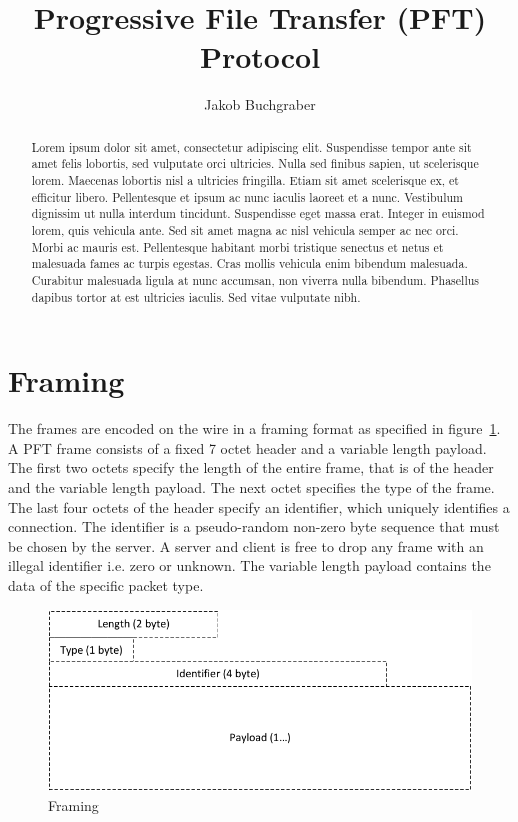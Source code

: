 \documentclass[]{article}
\begin{document}
\title{Progressive File Transfer (PFT) Protocol}
\author{
	Jakob Buchgraber
	}

\maketitle
\tableofcontents
\newpage

\begin{abstract}
Lorem ipsum dolor sit amet, consectetur adipiscing elit. Suspendisse tempor ante sit amet felis lobortis, sed vulputate orci ultricies. Nulla sed finibus sapien, ut scelerisque lorem. Maecenas lobortis nisl a ultricies fringilla. Etiam sit amet scelerisque ex, et efficitur libero. Pellentesque et ipsum ac nunc iaculis laoreet et a nunc. Vestibulum dignissim ut nulla interdum tincidunt. Suspendisse eget massa erat. Integer in euismod lorem, quis vehicula ante. Sed sit amet magna ac nisl vehicula semper ac nec orci. Morbi ac mauris est. Pellentesque habitant morbi tristique senectus et netus et malesuada fames ac turpis egestas. Cras mollis vehicula enim bibendum malesuada. Curabitur malesuada ligula at nunc accumsan, non viverra nulla bibendum. Phasellus dapibus tortor at est ultricies iaculis. Sed vitae vulputate nibh.
\end{abstract}


\section{Framing}

The frames are encoded on the wire in a framing format as specified in figure~\ref{framing}.
A PFT frame consists of a fixed 7 octet header and a variable length payload. The first
two octets specify the length of the entire frame, that is of the header and the variable
length payload. The next octet specifies the type of the frame. The last four octets of
the header specify an identifier, which uniquely identifies a connection. The identifier
is a pseudo-random non-zero byte sequence that must be chosen by the server. A server and
client is free to drop any frame with an illegal identifier i.e. zero or unknown. The variable length payload
contains the data of the specific packet type.

\begin{figure}[H]
\centering
\includegraphics[width=\textwidth]{frames/framing.pdf}
\caption{Framing}
\label{framing}
\end{figure}
\end{document}
